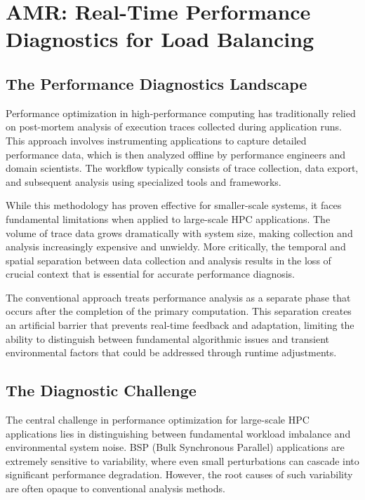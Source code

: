 \newpage
\chapter{AMR: Real-Time Performance Diagnostics for Load Balancing}

\section{The Performance Diagnostics Landscape}

Performance optimization in high-performance computing has traditionally relied on post-mortem
analysis of execution traces collected during application runs.
This approach involves instrumenting applications to capture detailed performance data, which is
then analyzed offline by performance engineers and domain scientists.
The workflow typically consists of trace collection, data export, and subsequent analysis using
specialized tools and frameworks.

While this methodology has proven effective for smaller-scale systems, it faces fundamental
limitations when applied to large-scale HPC applications.
The volume of trace data grows dramatically with system size, making collection and analysis
increasingly expensive and unwieldy.
More critically, the temporal and spatial separation between data collection and analysis results
in the loss of crucial context that is essential for accurate performance diagnosis.

The conventional approach treats performance analysis as a separate phase that occurs after the
completion of the primary computation.
This separation creates an artificial barrier that prevents real-time feedback and adaptation,
limiting the ability to distinguish between fundamental algorithmic issues and transient
environmental factors that could be addressed through runtime adjustments.

\section{The Diagnostic Challenge}

The central challenge in performance optimization for large-scale HPC applications lies in
distinguishing between fundamental workload imbalance and environmental system noise.
BSP (Bulk Synchronous Parallel) applications are extremely sensitive to variability, where even
small perturbations can cascade into significant performance degradation.
However, the root causes of such variability are often opaque to conventional analysis methods.

